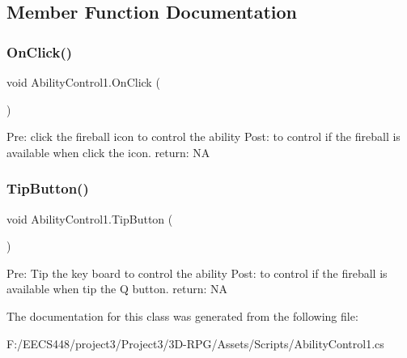 \subsection{Member Function Documentation}
\mbox{\label{class_ability_control1_abc527bf8d7082fb87499fef96b19fd3c}} 
\subsubsection{\texorpdfstring{On\+Click()}{OnClick()}}
{\footnotesize\ttfamily void Ability\+Control1.\+On\+Click (\begin{DoxyParamCaption}{ }\end{DoxyParamCaption})}

Pre\+: click the fireball icon to control the ability Post\+: to control if the fireball is available when click the icon. return\+: NA \mbox{\label{class_ability_control1_a30521f80c369999bf9e6a5aa29a16d8f}} 
\subsubsection{\texorpdfstring{Tip\+Button()}{TipButton()}}
{\footnotesize\ttfamily void Ability\+Control1.\+Tip\+Button (\begin{DoxyParamCaption}{ }\end{DoxyParamCaption})}

Pre\+: Tip the key board to control the ability Post\+: to control if the fireball is available when tip the Q button. return\+: NA 

The documentation for this class was generated from the following file\+:\begin{DoxyCompactItemize}
\item 
F\+:/\+E\+E\+C\+S448/project3/\+Project3/3\+D-\/\+R\+P\+G/\+Assets/\+Scripts/Ability\+Control1.\+cs\end{DoxyCompactItemize}
